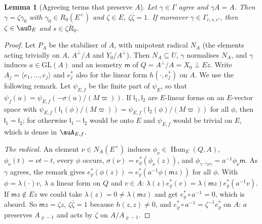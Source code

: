 \documentclass[10pt]{amsart}
\newtheorem{lemma}[theorem]{Lemma}
\theoremstyle{definition}
\theoremstyle{remark}
\providecommand{\auGL}{\mathrm{GL}}
\providecommand{\aubar}[1]{\overline{#1}}
\providecommand{\pbR}{\overline R_0}
\begin{document}
\begin{lemma}[Agreeing terms that preserve $A$]\label{pbe:scalar}
Let $\gamma\in\Gamma$ agree and $\gamma A=A$. Then $\gamma=\zeta\gamma_0$ with $\gamma_0\in R_0(E^+)$
and $\zeta\in E$, $\zeta\aubar\zeta=1$. If moreover $\gamma\in\Gamma_{c,s,c'}$,
then $\zeta\in\auO_E$ and $s\in\zeta\pbR$.
\end{lemma}
\begin{proof}
Let $P_A$ be the stabiliser of $A$, with unipotent radical $N_A$ (the elements acting trivially on
$A$, $A^\perp/A$ and $Y_0/A^\perp$). Then $N_A\subseteq U$, $\gamma$ normalises $N_A$, and $\gamma$
induces $a\in\auGL(A)$ and an isometry $\mathsf m$ of $Q=A^\perp/A=X_0\perp Ez$. Write $A_j=\langle
e_1,\dots,e_j\rangle$ and $e_j^*$ also for the linear form $h(\cdot,e_j^*)$ on $A$. We use the
following remark. Let $\psi_{E,f}$ be the finite part of $\psi_E$, so that $\psi_f(u)=\psi_{E,f}(-
\sigma(u)/(M\varpi))$. If $\mathsf l_1,\mathsf l_2$ are $E$-linear forms on an $E$-vector space with
$\psi_{E,f}(\mathsf l_1(\phi)/(M\varpi))=\psi_{E,f}(\mathsf l_2(\phi)/(M\varpi))$ for all $\phi$, then
$\mathsf l_1=\mathsf l_2$; for otherwise $\mathsf l_1-\mathsf l_2$ would be onto $E$ and $\psi_{E,f}$
would be trivial on $E$, which is dense in $\auA_{E,f}$.

\emph{The radical.} An element $\nu\in N_A(E^+)$ induces $\phi_\nu\in\operatorname{Hom}_E(Q,A)$,
$\phi_\nu(t)=\nu t-t$, every $\phi$ occurs, $\sigma(\nu)=e_\varrho^*(\phi_\nu(z))$, and $\phi_{\gamma^{
-1}\nu\gamma}=a^{-1}\phi_\nu\mathsf m$. As $\gamma$ agrees, the remark gives $e_\varrho^*(\phi(z))=e_
\varrho^*(a^{-1}\phi(\mathsf mz))$ for all $\phi$. With $\phi=\lambda(\cdot)v$, $\lambda$ a linear
form on $Q$ and $v\in A$: $\lambda(z)e_\varrho^*(v)=\lambda(\mathsf mz)e_\varrho^*(a^{-1}v)$. If
$\mathsf mz\notin Ez$ we could take $\lambda(z)=0\ne\lambda(\mathsf mz)$ and get $e_\varrho^*\circ a^{
-1}=0$, which is absurd. So $\mathsf mz=\zeta z$, $\zeta\aubar\zeta=1$ because $h(z,z)\ne0$, and
$e_\varrho^*\circ a^{-1}=\zeta^{-1}e_\varrho^*$ on $A$: $a$ preserves $A_{\varrho-1}$ and acts by
$\zeta$ on $A/A_{\varrho-1}$.


\end{proof}
\end{document}
